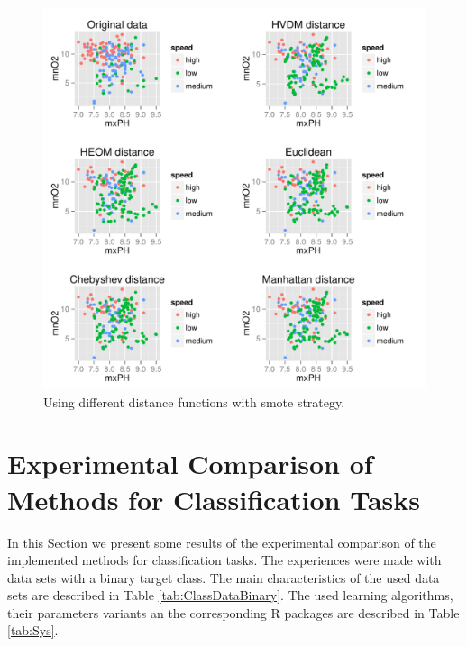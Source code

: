 \documentclass[10pt,a4paper]{article}\usepackage[]{graphicx}\usepackage[]{color}
\makeatletter
\def\maxwidth{ %
  \ifdim\Gin@nat@width>\linewidth
    \linewidth
  \else
    \Gin@nat@width
  \fi
}
\newenvironment{knitrout}{}{} %
\makeatother
\begin{document}
\begin{knitrout}\footnotesize
{}\color{fgcolor}\begin{figure}

{\centering \includegraphics[width=\maxwidth]{figures/UBL-dist_HVDM2-1} 

}

\caption[Using different distance functions with  smote strategy]{Using different distance functions with  smote strategy.}\label{fig:dist_HVDM2}
\end{figure}


\end{knitrout}




\section{Experimental Comparison of Methods for Classification Tasks}

In this Section we present some results of the experimental comparison of the implemented methods for classification tasks. 
The experiences were made with data sets with a binary target class. The main characteristics of the used data sets are described in Table \ref{tab:ClassDataBinary}.
The used learning algorithms, their parameters variants an the corresponding R packages are described in Table \ref{tab:Sys}.
\end{document}
